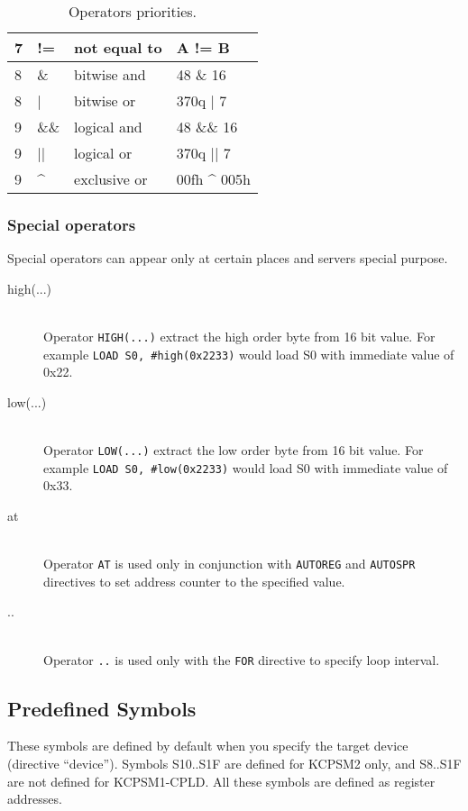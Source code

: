 \begin{table}[h!]
\begin{tabular}{|l|l|l|l|}
                7        & !=       & not equal to            &  A != B         \\\hline
                8        & \&       & bitwise and             & 48 \& 16        \\\hline
                8        & |        & bitwise or              & 370q | 7        \\\hline
                9        & \&\&     & logical and             & 48 \&\& 16      \\\hline
                9        & ||       & logical or              & 370q || 7       \\\hline
                9        & \^{}     & exclusive or            & 00fh \^{} 005h  \\\hline
            \end{tabular}
            \caption{Operators priorities.}
        \end{table}

        \subsubsection{Special operators}
            Special operators can appear only at certain places and servers special purpose.
            \begin{description}
                \item[high(...)]~\\
                    Operator \texttt{HIGH(...)} extract the high order byte from 16 bit value. For example \texttt{LOAD  S0, \#high(0x2233)} would load S0 with immediate value of 0x22.
                \item[low(...)]~\\
                    Operator \texttt{LOW(...)} extract the low order byte from 16 bit value. For example \texttt{LOAD  S0, \#low(0x2233)} would load S0 with immediate value of 0x33.
                \item[at]~\\
                    Operator \texttt{AT} is used only in conjunction with \texttt{AUTOREG} and \texttt{AUTOSPR} directives to set address counter to the specified value.
                \item[..]~\\
                    Operator \texttt{..} is used only with the \texttt{FOR} directive to specify loop interval.
            \end{description}

    \clearpage
    \subsection{Predefined Symbols}
        These symbols are defined by default when you specify the target device (directive ``device''). Symbols S10..S1F are defined for KCPSM2 only, and S8..S1F are not defined for KCPSM1-CPLD. All these symbols are defined as register addresses.


